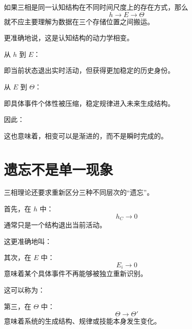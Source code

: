 如果三相是同一认知结构在不同时间尺度上的存在方式，那么
\[
h\rightarrow E\rightarrow\Theta
\]
就不应主要理解为数据在三个存储位置之间搬运。

更准确地说，这是认知结构的动力学相变。

从 $h$ 到 $E$：
\begin{statementbox}
\centering
{}
\end{statementbox}

即当前状态退出实时活动，但获得更加稳定的历史身份。

从 $E$ 到 $\Theta$：
\begin{statementbox}
\centering
{}
\end{statementbox}

即具体事件个体性被压缩，稳定规律进入未来生成结构。

因此：
\begin{statementbox}
\centering
{}
\end{statementbox}

这也意味着，相变可以是渐进的，而不是瞬时完成的。

\section{遗忘不是单一现象}

三相理论还要求重新区分三种不同层次的“遗忘”。

首先，在 $h$ 中：
\[
h_C\rightarrow0
\]
通常只是一个结构退出当前活动。

这更准确地叫：
\begin{statementbox}
\centering
{}
\end{statementbox}

其次，在 $E$ 中：
\[
E_i\rightarrow0
\]
意味着某个具体事件不再能够被独立重新识别。

这可以称为：
\begin{statementbox}
\centering
{}
\end{statementbox}

第三，在 $\Theta$ 中：
\[
\Theta\rightarrow\Theta'
\]
意味着系统的生成结构、规律或技能本身发生变化。

